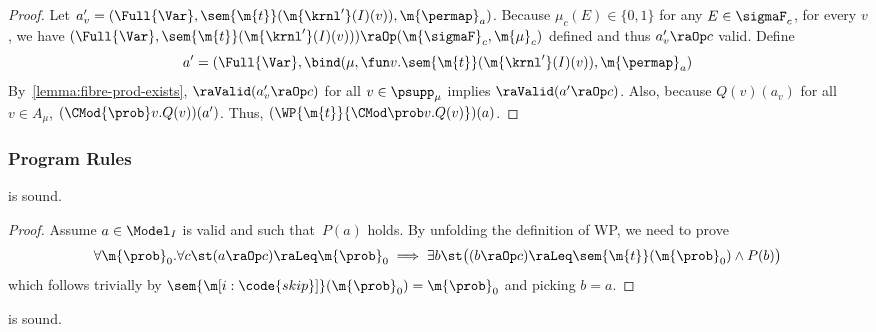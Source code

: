 \documentclass[acmsmall,nonacm,screen,appendix]{acmart}
\begin{document}
\begin{proof}
  Let $a'_v =  (\Full{\Var}, \sem{\m{t}} (\m{\krnl'}(I)(v)), \m{\permap}_{a})$.
  Because $\mu_c(E) \in \{0, 1\}$ for any $E \in \sigmaF_c$, for every $v$,
  we have $ (\Full{\Var}, \sem{\m{t}} (\m{\krnl'}(I)(v)))  \raOp (\m{\sigmaF}_c, \m{\mu}_c)$
  defined and thus
  $a'_v \raOp c$ valid.
  Define
  \[
    a' =
     (\Full{\Var},
      \bind(\mu, \fun v . \sem{\m{t}} (\m{\krnl'}(I)(v)),
      \m{\permap}_a)
  \]
  By~\cref{lemma:fibre-prod-exists},
  $ \raValid(a'_v \raOp c)$ for all $v \in \psupp_{\mu}$ implies
  $\raValid(a' \raOp c)$.
  Also, because  $Q(v)(a_v)$ for all $v \in A_{\mu}$,
  $(\CMod{\prob} v. Q(v))(a') $.
Thus, $(\WP {\m{t}}{\CMod\prob v. {Q(v)}}) (a)$.
\end{proof}
 
\subsubsection{Program Rules}
\begin{lemma}
\label{proof:wp-skip}
   is sound.
\end{lemma}

\begin{proof}
  Assume $a \in \Model_I$ is valid and such that~$P(a)$ holds.
  By unfolding the definition of WP, we need to prove
  \[
    \forall \m{\prob}_0.
      \forall c \st
      (a \raOp c) \raLeq \m{\prob}_0
      \implies
      \exists b \st
      \bigl(
        (b \raOp c) \raLeq \sem{\m{t}}(\m{\prob}_0)
        \land
        P(b)
      \bigr)
  \]
  which follows trivially
  by $\sem{\m[i:\code{skip}]}(\m{\prob}_0)=\m{\prob}_0$ and picking $b=a$.
\end{proof}
 \begin{lemma}
\label{proof:wp-seq}
   is sound.
\end{lemma}
\end{document}
